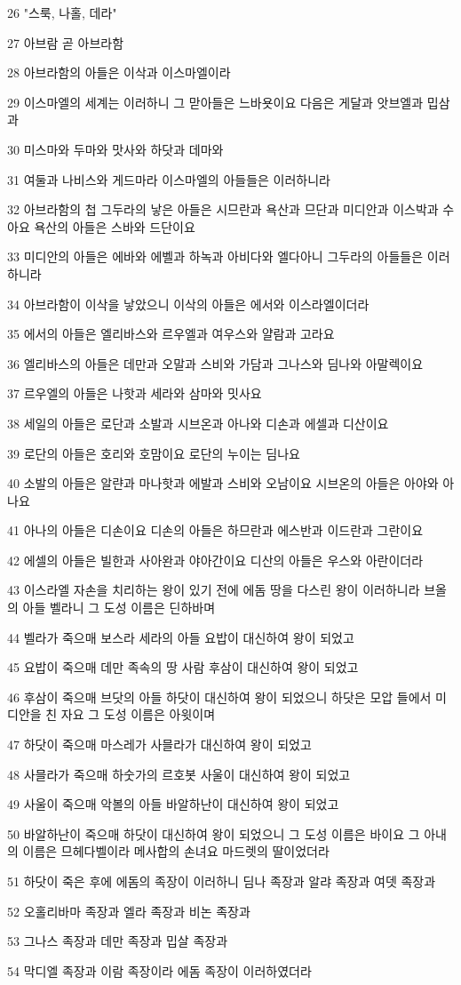 \par 26 "스룩, 나홀, 데라"
\par 27 아브람 곧 아브라함
\par 28 아브라함의 아들은 이삭과 이스마엘이라
\par 29 이스마엘의 세계는 이러하니 그 맏아들은 느바욧이요 다음은 게달과 앗브엘과 밉삼과
\par 30 미스마와 두마와 맛사와 하닷과 데마와
\par 31 여둘과 나비스와 게드마라 이스마엘의 아들들은 이러하니라
\par 32 아브라함의 첩 그두라의 낳은 아들은 시므란과 욕산과 므단과 미디안과 이스박과 수아요 욕산의 아들은 스바와 드단이요
\par 33 미디안의 아들은 에바와 에벨과 하녹과 아비다와 엘다아니 그두라의 아들들은 이러하니라
\par 34 아브라함이 이삭을 낳았으니 이삭의 아들은 에서와 이스라엘이더라
\par 35 에서의 아들은 엘리바스와 르우엘과 여우스와 얄람과 고라요
\par 36 엘리바스의 아들은 데만과 오말과 스비와 가담과 그나스와 딤나와 아말렉이요
\par 37 르우엘의 아들은 나핫과 세라와 삼마와 밋사요
\par 38 세일의 아들은 로단과 소발과 시브온과 아나와 디손과 에셀과 디산이요
\par 39 로단의 아들은 호리와 호맘이요 로단의 누이는 딤나요
\par 40 소발의 아들은 알랸과 마나핫과 에발과 스비와 오남이요 시브온의 아들은 아야와 아나요
\par 41 아나의 아들은 디손이요 디손의 아들은 하므란과 에스반과 이드란과 그란이요
\par 42 에셀의 아들은 빌한과 사아완과 야아간이요 디산의 아들은 우스와 아란이더라
\par 43 이스라엘 자손을 치리하는 왕이 있기 전에 에돔 땅을 다스린 왕이 이러하니라 브올의 아들 벨라니 그 도성 이름은 딘하바며
\par 44 벨라가 죽으매 보스라 세라의 아들 요밥이 대신하여 왕이 되었고
\par 45 요밥이 죽으매 데만 족속의 땅 사람 후삼이 대신하여 왕이 되었고
\par 46 후삼이 죽으매 브닷의 아들 하닷이 대신하여 왕이 되었으니 하닷은 모압 들에서 미디안을 친 자요 그 도성 이름은 아윗이며
\par 47 하닷이 죽으매 마스레가 사믈라가 대신하여 왕이 되었고
\par 48 사믈라가 죽으매 하숫가의 르호봇 사울이 대신하여 왕이 되었고
\par 49 사울이 죽으매 악볼의 아들 바알하난이 대신하여 왕이 되었고
\par 50 바알하난이 죽으매 하닷이 대신하여 왕이 되었으니 그 도성 이름은 바이요 그 아내의 이름은 므헤다벨이라 메사합의 손녀요 마드렛의 딸이었더라
\par 51 하닷이 죽은 후에 에돔의 족장이 이러하니 딤나 족장과 알랴 족장과 여뎃 족장과
\par 52 오홀리바마 족장과 엘라 족장과 비논 족장과
\par 53 그나스 족장과 데만 족장과 밉살 족장과
\par 54 막디엘 족장과 이람 족장이라 에돔 족장이 이러하였더라

